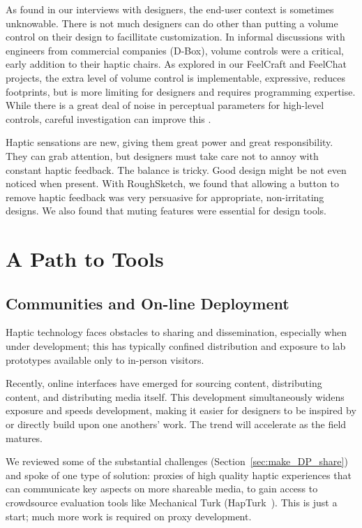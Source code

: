 As found in our interviews with designers, the end-user context is sometimes unknowable.
There is not much designers can do other than putting a volume control on their design to facillitate customization.
In informal discussions with engineers from commercial companies (\eg D-Box), volume controls were a critical, early addition to their haptic chairs.
As explored in our FeelCraft and FeelChat projects, the extra level of volume control is implementable, expressive, reduces footprints, but is more limiting for designers and requires programming expertise.
While there is a great deal of noise in perceptual parameters for high-level controls, careful investigation can improve this \cite{Israr2014,Seifi2014}.



Haptic sensations are new, giving them great power and great responsibility.
They can grab attention, but designers must take care not to annoy with constant haptic feedback.
The balance is tricky. 
Good design might be not even noticed when present.
With RoughSketch, we found that allowing a button to remove haptic feedback was very persuasive for appropriate, non-irritating designs.
We also found that muting features were essential for \haxd design tools.






\section{A Path to \haxd Tools}


\subsection{Communities and On-line Deployment}
Haptic technology faces obstacles to sharing and dissemination, especially when under development; this has typically confined distribution and exposure to lab prototypes available only to in-person visitors.

Recently, online interfaces have emerged for sourcing content, distributing content, and distributing media itself. 
This development  simultaneously widens exposure and speeds development, making it easier for designers to be inspired by or directly build upon one anothers' work. 
The trend will accelerate as the field matures.


    We reviewed some of the substantial challenges  (Section~\ref{sec:make_DP_share}) and spoke of one type of solution: proxies of high quality haptic experiences that can communicate key aspects on more shareable media, to gain access to crowdsource evaluation tools like Mechanical Turk (HapTurk~\cite{Schneider2016b}). This is just a start; much more work is required on proxy development.

